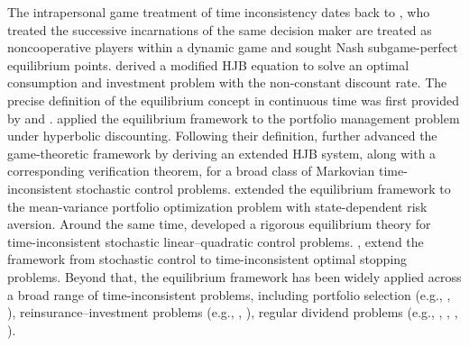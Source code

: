 \documentclass[11pt,reqno]{article}%
\numberwithin{equation}{section}
\begin{document}
The intrapersonal game treatment of time inconsistency dates back to \citet{strotz1955myopia}, who treated the successive incarnations of the same decision maker are treated as noncooperative players within a dynamic game and sought Nash subgame-perfect equilibrium points. \citet{Marin2010consum} derived a modified HJB equation to solve an optimal consumption and investment problem with the non-constant discount rate. The precise definition of the equilibrium concept in continuous time was first provided by \citet{ekeland2006being,ekeland2010the} and \citet{ekeland2008invest}. \citet{ekeland2012time} applied the equilibrium framework to the portfolio management problem under hyperbolic discounting. Following their definition, \citet{bjork2010general} further advanced the game-theoretic framework by deriving an extended HJB system, along with a corresponding verification theorem, for a broad class of Markovian time-inconsistent stochastic control problems. \citet{bjork2014mean} extended the equilibrium framework to the mean-variance portfolio optimization problem with state-dependent risk aversion. Around the same time, \citet{hu2012time,hu2017time} developed a rigorous equilibrium theory for time-inconsistent stochastic linear–quadratic control problems. \citet{christensen2018on,christensen2020on}, \citet{ebert2020weighted} extend the framework from stochastic control to time-inconsistent optimal stopping problems. Beyond that, the equilibrium framework has been widely applied across a broad range of time-inconsistent problems, including portfolio selection (e.g., \citet{kryger2010some}, \citet{dong2014time}), reinsurance–investment problems (e.g., \citet{li2015time}, \citet{liang2015time} \citet{lin2016time}), regular dividend problems (e.g., \citet{cao2025equilibrium}, \citet{hu2025equilibrium}, \citet{li2016equilibrium}, \citet{ZHAO20141}).
\end{document}

